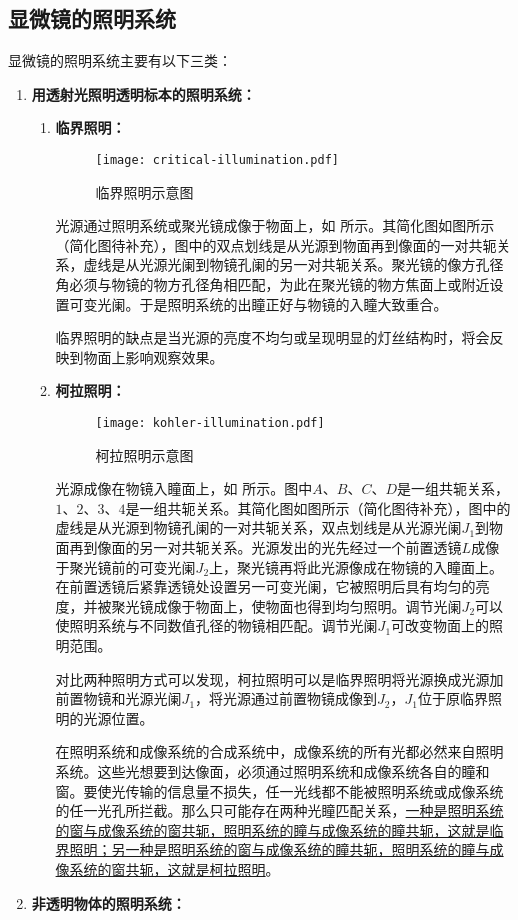\documentclass[cn,10pt,chinesefont=founder,math=mtpro2,cite=super,toc=onecol,twoside,openany]{elegantbook}
\begin{document}
\subsection{显微镜的照明系统}
显微镜的照明系统主要有以下三类：
\begin{enumerate}
	\item \textbf{用透射光照明透明标本的照明系统：}
	\begin{enumerate}
		\item \textbf{临界照明：}
		
		\begin{figure}[htbp]
			\centering
			\texttt{[image: critical-illumination.pdf]}
			\caption{临界照明示意图}
			\label{fig:critical-illumination}
		\end{figure}
		
		光源通过照明系统或聚光镜成像于物面上，如 所示。其简化图如图所示（简化图待补充），图中的双点划线是从光源到物面再到像面的一对共轭关系，虚线是从光源光阑到物镜孔阑的另一对共轭关系。聚光镜的像方孔径角必须与物镜的物方孔径角相匹配，为此在聚光镜的物方焦面上或附近设置可变光阑。于是照明系统的出瞳正好与物镜的入瞳大致重合。
		\begin{note}
			临界照明的缺点是当光源的亮度不均匀或呈现明显的灯丝结构时，将会反映到物面上影响观察效果。
		\end{note}
		\item \textbf{柯拉照明：}
		
		\begin{figure}[htbp]
			\centering
			\texttt{[image: kohler-illumination.pdf]}
			\caption{柯拉照明示意图}
			\label{fig:kohler-illumination}
		\end{figure}
		
		光源成像在物镜入瞳面上，如 所示。图中$A$、$B$、$C$、$D$是一组共轭关系，$1$、$2$、$3$、$4$是一组共轭关系。其简化图如图所示（简化图待补充），图中的虚线是从光源到物镜孔阑的一对共轭关系，双点划线是从光源光阑$J_1$到物面再到像面的另一对共轭关系。光源发出的光先经过一个前置透镜$L$成像于聚光镜前的可变光阑$J_2$上，聚光镜再将此光源像成在物镜的入瞳面上。在前置透镜后紧靠透镜处设置另一可变光阑，它被照明后具有均匀的亮度，并被聚光镜成像于物面上，使物面也得到均匀照明。调节光阑$J_2$可以使照明系统与不同数值孔径的物镜相匹配。调节光阑$J_1$可改变物面上的照明范围。
		\begin{note}
			对比两种照明方式可以发现，柯拉照明可以是临界照明将光源换成光源加前置物镜和光源光阑$J_1$，将光源通过前置物镜成像到$J_2$，$J_1$位于原临界照明的光源位置。
		\end{note}
		\begin{property}
			在照明系统和成像系统的合成系统中，成像系统的所有光都必然来自照明系统。这些光想要到达像面，必须通过照明系统和成像系统各自的瞳和窗。要使光传输的信息量不损失，任一光线都不能被照明系统或成像系统的任一光孔所拦截。那么只可能存在两种光瞳匹配关系，\uline{一种是照明系统的窗与成像系统的窗共轭，照明系统的瞳与成像系统的瞳共轭，这就是临界照明；另一种是照明系统的窗与成像系统的瞳共轭，照明系统的瞳与成像系统的窗共轭，这就是柯拉照明}。
		\end{property}
	\end{enumerate}
	\item \textbf{非透明物体的照明系统：}
	

\end{enumerate}
\end{document}
